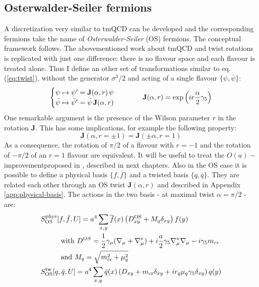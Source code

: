 \documentclass[english, LaM, oneside, noexaminfo]{sapthesis}
\newcommand{\oait}{$O(a)-$improvement}
\begin{document}
\subsection{Osterwalder-Seiler fermions}\label{sec:OS-regularization}
\noindent
A discretization very similar to tmQCD can be developed and the corresponding fermions take the name of {\it Osterwalder-Seiler} (OS) fermions.
The conceptual framework follows.
The abovementioned work about tmQCD and twist rotations is replicated with just one difference: there is no flavour space and each flavour is treated alone.
Thus I define an other set of transformations similar to eq. (\ref{eq:twist}), without the generator $\sigma^3/2$ and acting of a single flavour $\{\psi,\bar \psi\}$:
\begin{equation}\label{eq:twistOS}
    \begin{cases}
        \psi \mapsto \psi' = \mathbf{J}(\alpha,r) \hspace*{0.5mm} \psi \\
        \bar \psi \mapsto \bar \psi' = \bar \psi \hspace*{0.5mm} \mathbf{J}(\alpha,r) 
    \end{cases}
    \hspace*{1cm}
    \mathbf{J}(\alpha,r) = \text{exp}\left(i r \frac{\alpha}{2} \gamma_5\right)
\end{equation}
One remarkable argument is the presence of the Wilson parameter $r$ in the rotation $\mathbf{J}$.
This has some implications, for example the following property:
\begin{equation*}
    \mathbf{J}(\alpha, r=\pm 1) = \mathbf{J}(\pm\alpha, r= 1)
\end{equation*}
As a consequence, the rotation of $\pi/2$ of a flavour with $r=-1$ and the rotation of $-\pi/2$ of an $r=1$ flavour are equivalent.
It will be useful to treat the \oait\space proposed in \cite{FR2}, described in next chapters.
\newline
Also in the OS case it is possible to define a physical basis $\{f,\bar f\}$ and a twisted basis $\{q,\bar q\}$.
They are related each other through an OS twist $\mathbf{J}(\alpha, r)$ and described in Appendix \ref{app:physical-basis}.
The actions in the two basis - at maximal twist $\alpha = \pi/2$ - are:
\begin{equation*}
    \begin{aligned}
        & S^\text{phys}_\text{OS} [f,\bar{f},U] = a^4 \sum_{x,y} \overline{f} (x) \left( D_{xy}^\text{OS} + M_q \delta_{xy} \right) f (y) \\
        & \hspace*{1cm}\text{with } D^{OS} = \frac{1}{2}\gamma_\mu(\nabla_\mu+\nabla_\mu^*) + i\frac{a}{2}\gamma_5\nabla_\mu^*\nabla_\mu -i\gamma_5 m_{cr} \\
        & \hspace*{1cm}\text{and  } M_q = \sqrt{m_\text{cr}^2 + \mu_q^2}\\
        & S^\text{tw}_\text{OS}[q,\bar q, U] = a^4 \sum_{x,y} \bar q(x) \left( D_{xy} + m_\text{cr} \delta_{xy} + i r_q \mu_q\gamma_5 \delta_{xy} \right) q (y)  \\
    \end{aligned}
\end{equation*}
\end{document}

